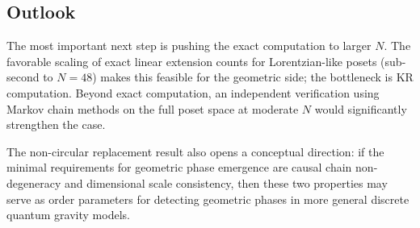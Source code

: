 \documentclass[11pt,a4paper]{article}
\begin{document}
\subsection{Outlook}

The most important next step is pushing the exact computation to larger $N$. The favorable scaling of exact linear extension counts for Lorentzian-like posets (sub-second to $N = 48$) makes this feasible for the geometric side; the bottleneck is KR computation. Beyond exact computation, an independent verification using Markov chain methods on the full poset space at moderate $N$ would significantly strengthen the case.

The non-circular replacement result also opens a conceptual direction: if the minimal requirements for geometric phase emergence are causal chain non-degeneracy and dimensional scale consistency, then these two properties may serve as order parameters for detecting geometric phases in more general discrete quantum gravity models.
\end{document}
